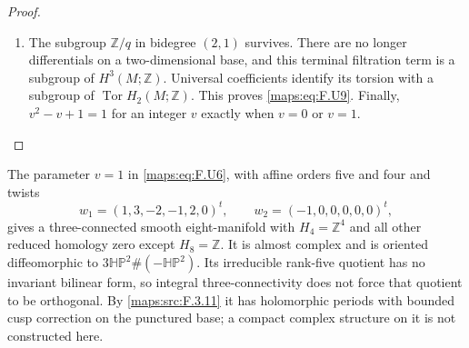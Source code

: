 \begin{proof}
\begin{enumerate}[label={$\langle1\rangle$\arabic*.}]
\item The subgroup $\mathbb Z/q$ in bidegree $(2,1)$ survives.
There are no longer differentials on a two-dimensional base,
and this terminal filtration term is a subgroup of
$H^3(M;\mathbb Z)$.  Universal coefficients identify its
torsion with a subgroup of $\operatorname{Tor}H_2(M;\mathbb Z)$.
This proves \eqref{maps:eq:F.U9}.  Finally, $v^2-v+1=1$ for an integer $v$
exactly when $v=0$ or $v=1$.

\end{enumerate}
\end{proof}




\begin{theorem}\hypertarget{tag-02N7}{}\label{maps:src:F.2.18}


The parameter $v=1$ in \eqref{maps:eq:F.U6}, with affine orders five and four
and twists
\[
 w_1=(1,3,-2,-1,2,0)^t,\qquad
 w_2=(-1,0,0,0,0,0)^t,
\]
gives a three-connected smooth eight-manifold with
$H_4=\mathbb Z^4$ and all other reduced homology zero except
$H_8=\mathbb Z$.  It is almost complex and is oriented
diffeomorphic to $3\mathbb{HP}^2\#(-\mathbb{HP}^2)$.
Its irreducible rank-five quotient has no invariant bilinear
form, so integral three-connectivity does not force that
quotient to be orthogonal.  By \cref{maps:src:F.3.11} it has holomorphic periods with bounded cusp correction on the punctured base; a compact complex structure on it is not constructed here.

\end{theorem}


